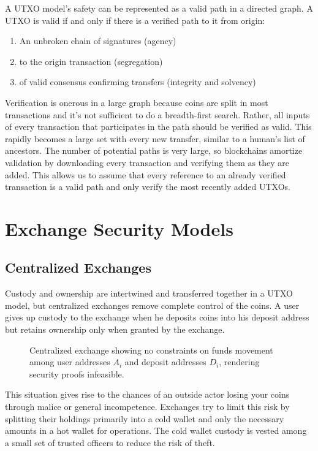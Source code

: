 \documentclass[12pt,a4paper]{article}
\begin{document}
A UTXO model’s safety can be represented as a valid path in a directed graph. A UTXO is valid if and only if there is a verified path to it from origin:
\begin{enumerate}
    \item An unbroken chain of signatures (agency)
    \item to the origin transaction (segregation)
    \item of valid consensus confirming transfers (integrity and solvency)
\end{enumerate}
Verification is onerous in a large graph because coins are split in most transactions and it’s not sufficient to do a breadth-first search. Rather, all inputs of every transaction that participates in the path should be verified as valid. This rapidly becomes a large set with every new transfer, similar to a human’s list of ancestors. The number of potential paths is very large, so blockchains amortize validation by downloading every transaction and verifying them as they are added. This allows us to assume that every reference to an already verified transaction is a valid path and only verify the most recently added UTXOs.

\section{Exchange Security Models}
\subsection{Centralized Exchanges}
Custody and ownership are intertwined and transferred together in a UTXO model, but centralized exchanges remove complete control of the coins. A user gives up custody to the exchange when he deposits coins into his deposit address but retains ownership only when granted by the exchange.
\begin{figure}[ht]
\begin{center}

\end{center}
\caption{Centralized exchange showing no constraints on funds movement among user addresses $A_i$ and deposit addresses $D_i$, rendering security proofs infeasible. }
\end{figure}

This situation gives rise to the chances of an outside actor losing your coins through malice or general incompetence. Exchanges try to limit this risk by splitting their holdings primarily into a cold wallet\cite{BTCColdStorage} and only the necessary amounts in a hot wallet for operations. The cold wallet custody is vested among a small set of trusted officers to reduce the risk of theft.
\end{document}
